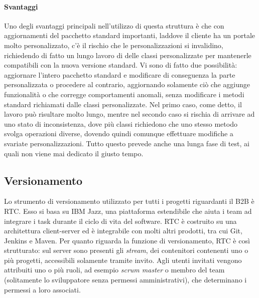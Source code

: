 \paragraph{Svantaggi}
Uno degli svantaggi principali nell'utilizzo di questa struttura è che con aggiornamenti del pacchetto standard importanti, laddove il cliente ha un portale molto personalizzato, c'è il rischio che le personalizzazioni si invalidino, richiedendo di fatto un lungo lavoro di  delle classi personalizzate per mantenerle compatibili con la nuova versione standard. Vi sono di fatto due possibilità: aggiornare l'intero pacchetto standard e modificare di conseguenza la parte personalizzata o procedere al contrario, aggiornando solamente ciò che aggiunge funzionalità o che corregge comportamenti anomali, senza modificare i metodi standard richiamati dalle classi personalizzate. Nel primo caso, come detto, il lavoro può risultare molto lungo, mentre nel secondo caso si rischia di arrivare ad uno stato di inconsistenza, dove più classi richiedono che uno stesso metodo svolga operazioni diverse, dovendo quindi comunque effettuare modifiche a svariate personalizzazioni. Tutto questo prevede anche una lunga fase di test, ai quali non viene mai dedicato il giusto tempo.

\subsection{Versionamento}
Lo strumento di versionamento utilizzato per tutti i progetti riguardanti il B2B è \Gls{RTC}. Esso si basa su IBM Jazz, una piattaforma estendibile che aiuta i team ad integrare i task durante il ciclo di vita del software. RTC è costruito su una architettura client-server ed è integrabile con molti altri prodotti, tra cui \gls{Git}, \Gls{Jenkins} e \Gls{Maven}. Per quanto riguarda la funzione di versionamento, RTC è così strutturato: sul server sono presenti gli \textit{stream}, dei contenitori contenenti uno o più progetti, accessibili solamente tramite invito. Agli utenti invitati vengono attribuiti uno o più ruoli, ad esempio \textit{scrum master} o membro del team (solitamente lo sviluppatore senza permessi amministrativi), che determinano i permessi a loro associati. 

